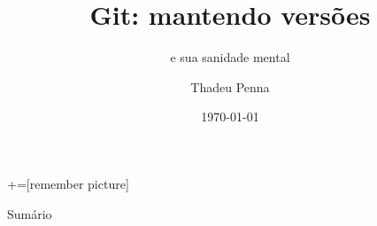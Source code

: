 \documentclass[dvipsnames,unknownkeysallowed,10pt,brazil]{beamer}
\title{Git: mantendo versões}
\subtitle{e sua sanidade mental}
\author{Thadeu Penna}
\date{\today}
\institute{thadeupenna@id.uff.br}
\begin{document}
+=[remember picture]

	\begin{frame}
		\transfade
		\titlepage
	\end{frame}

\newenvironment{amatrix}[1]{%
	\left(\begin{array}{@{}*{#1}{c}|c@{}}
	}{%
\end{array}\right)
}

\begin{frame}{Sumário}
\tableofcontents
\end{frame}

\end{document}
